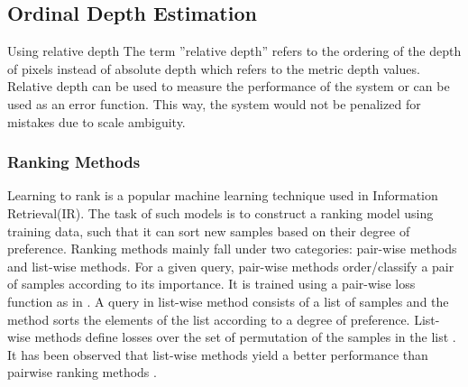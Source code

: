 \subsection{Ordinal Depth Estimation}
\label{sec:related:sec3:subsec2}
Using relative depth The term ”relative depth” refers to the ordering of the depth of pixels instead of absolute depth which refers to the metric depth values. Relative depth can be used to
measure the performance of the system or can be used as an error function. This way, the system would not be penalized for mistakes due to scale ambiguity.
\subsubsection*{Ranking Methods}
\label{sec:related:sec3:subsec2:part1}
Learning to rank is a popular machine learning technique used in Information Retrieval(IR)\cite{cao2007learning}. The task of such models is to construct a ranking model using training data, such that it can sort new samples based on their degree of preference.
Ranking methods mainly fall under two categories: pair-wise methods and list-wise methods. For a given query, pair-wise methods order/classify a pair of samples according to its importance. It is trained using a pair-wise loss function as in \cite{chen2016single}. A query in list-wise method consists of a list of samples and the method sorts the elements of the list according to a degree of preference. List-wise methods define losses over the set of permutation of the samples in the list \cite{liu2011learning}. It has been observed that list-wise methods yield a better performance than pairwise ranking methods \cite{cao2007learning}.


